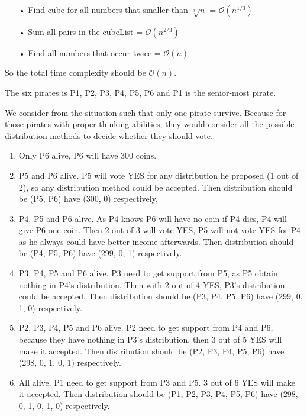 \documentclass{assignment}
\begin{document}
    \begin{enumerate}
    \item[•] Find cube for all numbers that smaller than $ \sqrt[3]{n}$ = $\mathcal{O}(n^{1/3})$
    \item[•] Sum all pairs in the cubeList = $\mathcal{O}(n^{2/3})$
    \item[•] Find all numbers that occur twice = $\mathcal{O}(n)$
    \end{enumerate}
So the total time complexity should be $\mathcal{O}(n)$.
 
    
 
    \begin{homeworkProblem}
    The six pirates is P1, P2, P3, P4, P5, P6 and P1 is the senior-most pirate.
    
    We consider from the situation such that only one pirate survive. Because for those pirates  with proper thinking abilities, they would consider all the possible distribution methods to decide whether they should vote. 
    \begin{enumerate}
    \item Only P6 alive, P6 will have 300 coins.
    \item P5 and P6 alive. P5 will vote YES for any distribution he proposed (1 out of 2), so any distribution method could be accepted. Then distribution should be (P5, P6) have (300, 0) respectively, 
    \item P4, P5 and P6 alive. As P4 knows P6 will have no coin if P4 dies, P4 will give P6 one coin. Then 2 out of 3 will vote YES, P5 will not vote YES for P4 as he always could have better  income afterwards. Then distribution should be (P4, P5, P6) have (299, 0, 1) respectively.
    \item P3, P4, P5 and P6 alive. P3 need to get support from P5, as P5 obtain nothing in P4's distribution. Then with 2 out of 4 YES, P3's distribution could be accepted. Then distribution should be (P3, P4, P5, P6) have (299, 0, 1, 0) respectively.
    \item P2, P3, P4, P5 and P6 alive. P2 need to get support from P4 and P6, because they have nothing in P3's distribution. then 3 out of 5 YES will make it accepted. Then distribution should be (P2, P3, P4, P5, P6) have (298, 0, 1, 0, 1) respectively.
    \item All alive. P1 need to get support from P3 and P5. 3 out of 6 YES will make it accepted. 
    Then distribution should be (P1, P2, P3, P4, P5, P6) have (298, 0, 1, 0, 1, 0) respectively.
    \end{enumerate}
    

\end{homeworkProblem}
\end{document}
